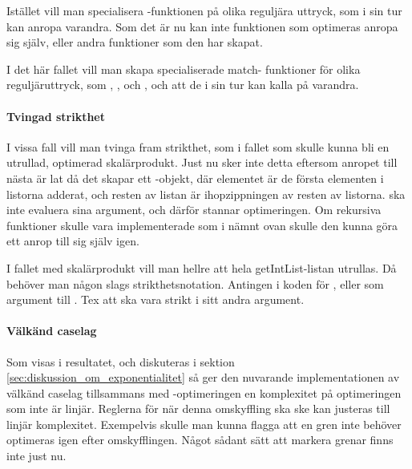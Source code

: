 \documentclass[Rapport]{subfiles}
\begin{document}
    Istället vill man specialisera -funktionen på olika reguljära uttryck,
som i sin tur kan anropa varandra. Som det är nu kan inte funktionen som
optimeras anropa sig själv, eller andra funktioner som den har skapat.

    I det här fallet vill man skapa specialiserade match-
funktioner för olika reguljäruttryck, 
som , ,  och , och att de i sin tur
kan kalla på varandra.

\paragraph{Tvingad strikthet}
I vissa fall vill man tvinga fram strikthet, som i fallet 
 som skulle kunna bli en utrullad,
optimerad skalärprodukt. Just nu sker inte detta eftersom anropet till nästa
 är lat då det skapar ett -objekt, där elementet är de första
elementen i listorna adderat, och resten av listan är ihopzippningen av resten
av listorna.  ska inte evaluera sina argument, och därför stannar
optimeringen. Om rekursiva funktioner skulle vara implementerade som i nämnt ovan
skulle den kunna göra ett anrop till sig själv igen.

    I fallet med skalärprodukt vill man hellre att hela getIntList-listan 
utrullas. Då behöver man någon slags strikthetsnotation. Antingen i koden 
för , eller som argument till . Tex att  ska vara strikt i 
sitt andra argument.

\paragraph{Välkänd caselag}
Som visas i resultatet, och diskuteras i sektion
\ref{sec:diskussion_om_exponentialitet} så ger den nuvarande implementationen
av välkänd caselag tillsammans med -optimeringen 
en komplexitet på optimeringen som inte är linjär. Reglerna för när denna
omskyffling ska ske kan justeras till linjär komplexitet. Exempelvis skulle man
kunna flagga att en gren inte behöver optimeras igen efter omskyfflingen. 
Något sådant sätt att markera grenar finns inte just nu.
\end{document}
